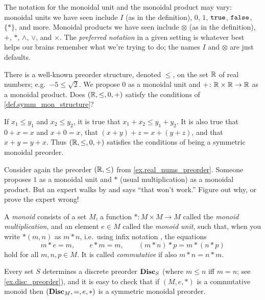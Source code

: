 \documentclass[7Sketches]{subfiles}
\begin{document}
The notation for the monoidal unit and the monoidal product may vary: monoidal
units we have seen include $I$ (as in the definition), $0$, $1$, $\mathtt{true}$,
$\mathtt{false}$, $\{*\}$, and more. Monoidal products we have seen include $\otimes$
(as in the definition), $+$, $*$, $\wedge$, $\vee$, and $\times$. The
\emph{preferred notation} in a given setting is whatever best helps our brains
remember what we're trying to do; the names $I$ and $\otimes$ are just defaults.%

\begin{example}%
\label{ex.real_nums_preorder}%
There is a well-known preorder structure, denoted $\leq$, on the set $\mathbb{R}$ of real numbers; e.g.\ $-5\leq \sqrt{2}$. We propose $0$ as a monoidal unit and $+\colon\mathbb{R}\times\mathbb{R}\to\mathbb{R}$ as a monoidal product. Does $(\mathbb{R},\leq,0,+)$ satisfy the conditions of \cref{def.symm_mon_structure}?

If $x_1\leq y_1$ and $x_2\leq y_2$, it is true that $x_1+x_2\leq y_1+y_2$. It is also true that $0+x=x$ and $x+0=x$, that $(x+y)+z=x+(y+z)$, and that $x+y=y+x$. Thus $(\mathbb{R},\leq,0,+)$ satisfies the conditions of being a symmetric monoidal preorder.
\end{example}

\begin{exercise}%
\label{exc.monoidal_reals} %
Consider again the preorder $(\mathbb{R},\leq)$ from \cref{ex.real_nums_preorder}. Someone proposes $1$ as a monoidal unit and $*$ (usual multiplication) as a monoidal product. But an expert walks by and says ``that won't work.'' Figure out why, or prove the expert wrong!
\end{exercise}

\begin{example}%
%
\label{ex.monoid}
A \emph{monoid} consists of a set $M$, a function $*\colon M\times M\to M$ called the \emph{monoid multiplication}, and an element $e\in M$ called the \emph{monoid unit}, such that, when you write $*(m,n)$ as $m*n$, i.e.\ using infix notation%
, the equations
\begin{equation} %
\label{eqn.monoid}
	m*e=m,\qquad e*m=m,\qquad (m*n)*p=m*(n*p)
\end{equation}
hold for all $m,n,p\in M$. It is called \emph{commutative} if also $m*n=n*m$.

Every set $S$ determines a discrete preorder $\mathbf{Disc}_S$ (where $m\leq n$ iff
$m=n$; see \cref{ex.disc_preorder}), and it is easy to check that if $(M,e,*)$
is a commutative monoid then $(\mathbf{Disc}_M,=,e,*)$ is a symmetric monoidal preorder.
\end{example}%
\end{document}
